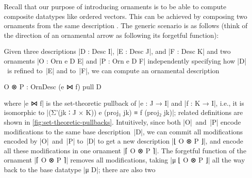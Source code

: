 Recall that our purpose of introducing ornaments is to be able to compute composite datatypes like ordered vectors.
This can be achieved by composing two ornaments from the same description .
The generic scenario is as follows (think of the direction of an ornamental arrow as following its forgetful function):
\begin{center}
\qquad
{}
\end{center}
Given three descriptions |D : Desc I|, |E : Desc J|, and |F : Desc K| and two ornaments |O : Orn e D E| and |P : Orn e D F| independently specifying how |D|~is refined to~|E| and to~|F|, we can compute an ornamental description
\begin{code}
O ⊗ P : OrnDesc (e ⋈ f) pull D
\end{code}
where |e ⋈ f| is the set-theoretic pullback of |e : J → I| and |f : K → I|, i.e., it is isomorphic to |(Σ'(jk ∶ J × K)) e (proj₁ jk) ≡ f (proj₂ jk)|; related definitions are shown in \autoref{fig:set-theoretic-pullbacks}.
Intuitively, since both |O|~and~|P| encode modifications to the same base description~|D|, we can commit all modifications encoded by |O|~and~|P| to~|D| to get a new description |⌊ O ⊗ P ⌋|, and encode all these modifications in one ornament |⌈ O ⊗ P ⌉|.
The forgetful function of the ornament |⌈ O ⊗ P ⌉| removes all modifications, taking |μ ⌊ O ⊗ P ⌋| all the way back to the base datatype |μ D|; there are also two 
